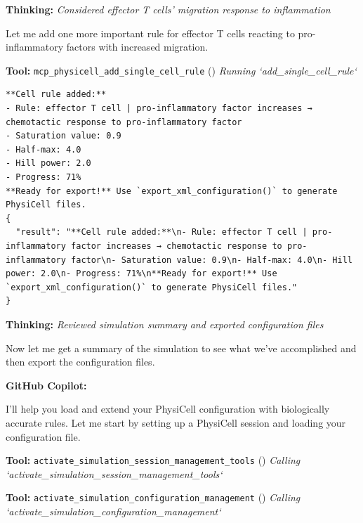\documentclass[11pt,a4paper]{article}
\begin{document}
\begin{thinkbox}
\textbf{Thinking:} \textit{Considered effector T cells' migration response to inflammation}

Let me add one more important rule for effector T cells reacting to pro-inflammatory factors with increased migration.

\end{thinkbox}
\begin{toolokbox}
\textbf{Tool:} \texttt{mcp\_physicell\_add\_single\_cell\_rule} (\checkmark)
\textit{Running `add\_single\_cell\_rule`}
\begin{lstlisting}
**Cell rule added:**
- Rule: effector T cell | pro-inflammatory factor increases → chemotactic response to pro-inflammatory factor
- Saturation value: 0.9
- Half-max: 4.0
- Hill power: 2.0
- Progress: 71%
**Ready for export!** Use `export_xml_configuration()` to generate PhysiCell files.
{
  "result": "**Cell rule added:**\n- Rule: effector T cell | pro-inflammatory factor increases → chemotactic response to pro-inflammatory factor\n- Saturation value: 0.9\n- Half-max: 4.0\n- Hill power: 2.0\n- Progress: 71%\n**Ready for export!** Use `export_xml_configuration()` to generate PhysiCell files."
}
\end{lstlisting}
\end{toolokbox}
\begin{thinkbox}
\textbf{Thinking:} \textit{Reviewed simulation summary and exported configuration files}

Now let me get a summary of the simulation to see what we've accomplished and then export the configuration files.

\end{thinkbox}
\begin{copilotbox}
\textbf{GitHub Copilot:}

I'll help you load and extend your PhysiCell configuration with biologically accurate rules. Let me start by setting up a PhysiCell session and loading your configuration file.

\end{copilotbox}
\begin{toolokbox}
\textbf{Tool:} \texttt{activate\_simulation\_session\_management\_tools} (\checkmark)
\textit{Calling `activate\_simulation\_session\_management\_tools`}
\end{toolokbox}
\begin{toolokbox}
\textbf{Tool:} \texttt{activate\_simulation\_configuration\_management} (\checkmark)
\textit{Calling `activate\_simulation\_configuration\_management`}
\end{toolokbox}
\end{document}

